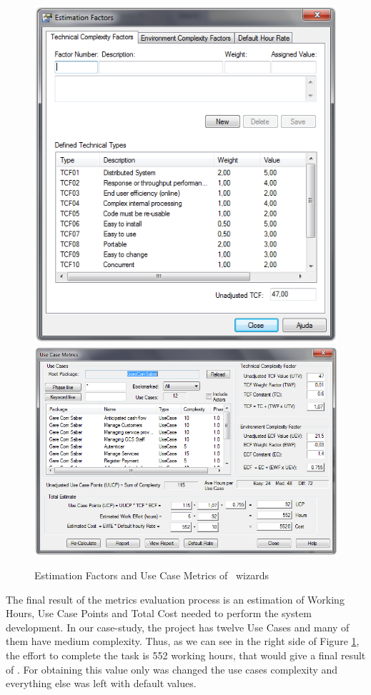 \begin{figure}[!htbp]
\includegraphics[scale=0.257]{images/sparxestim.png}
\hspace{0.1cm}
\includegraphics[scale=0.29]{images/sparx.png}
\caption{Estimation Factors and Use Case Metrics of \entArch~wizards}\label{img:sparxRes}
\end{figure}

The final result of the metrics evaluation process is an estimation of Working Hours, Use Case Points\cite{Ribu01estimatingobject-oriented} and Total Cost needed to perform the system development.
In our case-study, the project has twelve Use Cases and many of them have medium complexity. 
Thus, as we can see in the right side of Figure \ref{img:sparxRes}, the effort to complete the task is 552 working hours, that would give a final result of . 
For obtaining this value only was changed the use cases complexity and everything else was left with default values.
